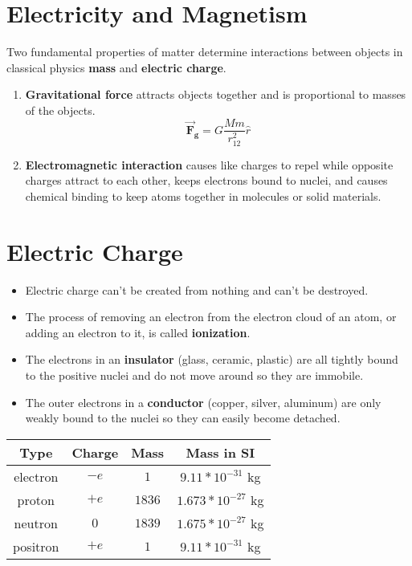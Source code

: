 \documentclass{article}
\begin{document}
\setlength{\parindent}{0pt}

\section*{Electricity and Magnetism}

Two fundamental properties of matter determine interactions between objects in classical physics
\textbf{mass} and \textbf{electric charge}.
\begin{enumerate}
    \item \textbf{Gravitational force} attracts objects together and is proportional to masses of
    the objects.
    \[\mathbf{\vec{F}_g} = G \frac{Mm}{r_{12}^2} \hat{r}\]
    \item \textbf{Electromagnetic interaction} causes like charges to repel while opposite charges
    attract to each other, keeps electrons bound to nuclei, and causes chemical binding to keep
    atoms together in molecules or solid materials.
    
\end{enumerate}
\section*{Electric Charge}

\begin{itemize}
    \item Electric charge can't be created from nothing and can't be destroyed.
    \item The process of removing an electron from the electron cloud of an atom, or adding an
    electron to it, is called \textbf{ionization}.
    \item The electrons in an \textbf{insulator} (glass, ceramic, plastic) are all tightly bound to
    the positive nuclei and do not move around so they are immobile.
    \item The outer electrons in a \textbf{conductor} (copper, silver, aluminum) are only weakly
    bound to the nuclei so they can easily become detached.
\end{itemize}
\begin{center}
\begin{tabular}{|c c c c|} 
    \hline
    Type & Charge & Mass & Mass in SI \\ [0.5ex] 
    \hline
    electron & $-e$ & $1$ & $9.11 * 10^{-31}$ kg \\ 
    \hline
    proton & $+e$ & $1836$ & $1.673 * 10^{-27}$ kg \\
    \hline
    neutron & $0$ & $1839$ & $1.675 * 10^{-27}$ kg \\
    \hline
    positron & $+e$ & $1$ & $9.11 * 10^{-31}$ kg \\
    \hline
\end{tabular}
\end{center}
\end{document}
